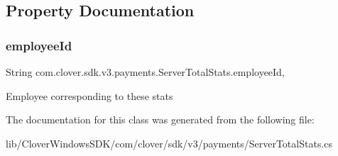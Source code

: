 \subsection{Property Documentation}
\mbox{\label{classcom_1_1clover_1_1sdk_1_1v3_1_1payments_1_1_server_total_stats_a9f0cf0d1a1508785839473b3d10892d5}} 
\subsubsection{\texorpdfstring{employee\+Id}{employeeId}}
{\footnotesize\ttfamily String com.\+clover.\+sdk.\+v3.\+payments.\+Server\+Total\+Stats.\+employee\+Id\hspace{0.3cm}{\ttfamily [get]}, {\ttfamily [set]}}



Employee corresponding to these stats 



The documentation for this class was generated from the following file\+:\begin{DoxyCompactItemize}
\item 
lib/\+Clover\+Windows\+S\+D\+K/com/clover/sdk/v3/payments/Server\+Total\+Stats.\+cs\end{DoxyCompactItemize}
